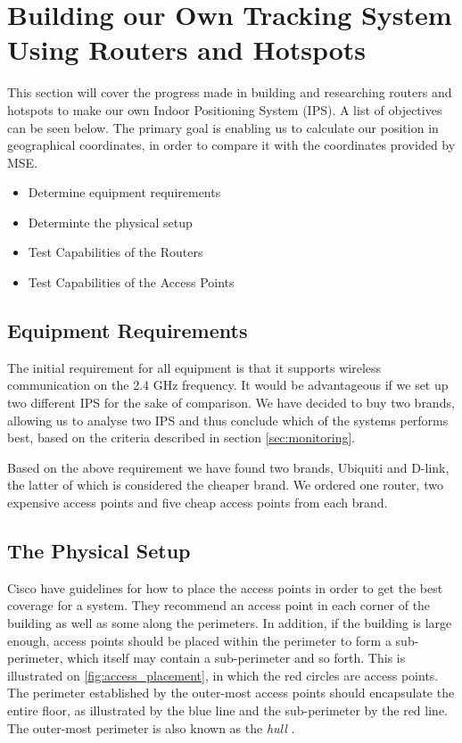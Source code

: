 \section{Building our Own Tracking System Using Routers and Hotspots} \label{sec:ourSys}
This section will cover the progress made in building and researching routers and hotspots to make our own Indoor Positioning System (IPS). A list of objectives can be seen below. The primary goal is enabling us to calculate our position in geographical coordinates, in order to compare it with the coordinates provided by MSE.

\begin{itemize}
	\item Determine equipment requirements
	\item Determinte the physical setup
	\item Test Capabilities of the Routers
	\item Test Capabilities of the Access Points
\end{itemize}

\subsection*{Equipment Requirements}
The initial requirement for all equipment is that it supports wireless communication on the 2.4 GHz frequency. It would be advantageous if we set up two different IPS for the sake of comparison. We have decided to buy two brands, allowing us to analyse two IPS and thus conclude which of the systems performs best, based on the criteria described in section \ref{sec:monitoring}.

Based on the above requirement we have found two brands, Ubiquiti and D-link, the latter of which is considered the cheaper brand. We ordered one router, two expensive access points and five cheap access points from each brand.

\subsection*{The Physical Setup}
Cisco \cite{access_point_placement} have guidelines for how to place the access points in order to get the best coverage for a system. They recommend an access point in each corner of the building as well as some along the perimeters. In addition, if the building is large enough, access points should be placed within the perimeter to form a sub-perimeter, which itself may contain a sub-perimeter and so forth. This is illustrated on \cref{fig:access_placement}, in which the red circles are access points. The perimeter established by the outer-most access points should encapsulate the entire floor, as illustrated by the blue line and the sub-perimeter by the red line. The outer-most perimeter is also known as the \textit{hull} \cite{access_point_placement}.

